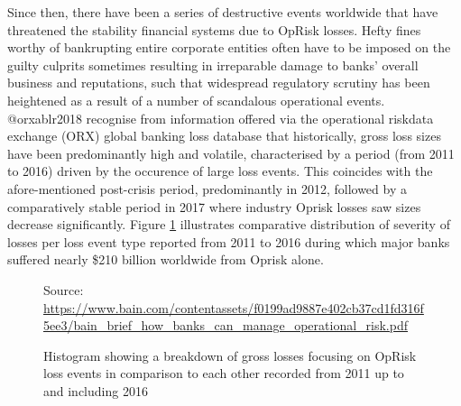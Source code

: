 \documentclass[]{article}
\begin{document}
Since then, there have been a series of destructive events worldwide
that have threatened the stability financial systems due to OpRisk
losses. Hefty fines worthy of bankrupting entire corporate entities
often have to be imposed on the guilty culprits sometimes resulting in
irreparable damage to banks' overall business and reputations, such that
widespread regulatory scrutiny has been heightened as a result of a
number of scandalous operational events. @orxablr2018 recognise from
information offered via the operational riskdata exchange (ORX) global
banking loss database that historically, gross loss sizes have been
predominantly high and volatile, characterised by a period (from 2011 to
2016) driven by the occurence of large loss events. This coincides with
the afore-mentioned post-crisis period, predominantly in 2012, followed
by a comparatively stable period in 2017 where industry Oprisk losses
saw sizes decrease significantly. Figure \ref{bank-oprisk_fig}
illustrates comparative distribution of severity of losses per loss
event type reported from 2011 to 2016 during which major banks suffered
nearly \$210 billion worldwide from Oprisk alone.\medskip

\begin{figure}
\centering
{}
             {Source: \url{https://www.bain.com/contentassets/f0199ad9887e402cb37cd1fd316f5ee3/bain_brief_how_banks_can_manage_operational_risk.pdf}}
\caption[Losses suffered from 2011 to 2016 from Oprisk]{Histogram showing a breakdown of gross losses focusing on OpRisk loss events in comparison to each other recorded from 2011 up to and including 2016}
\label{bank-oprisk_fig}
\end{figure}
\end{document}

